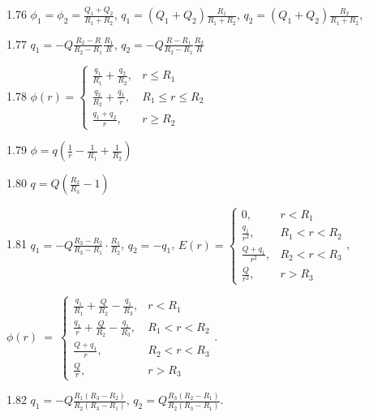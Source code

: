 \begin{Solution}{1.{76}}
	$\phi_1 = \phi_2 = \frac{Q_1 + Q_2}{R_1 + R_2}$, $q_1 = (Q_1 + Q_2) \frac{R_1}{R_1 + R_2}$, $q_2 = (Q_1 + Q_2) \frac{R_2}{R_1 + R_2}$,
\end{Solution}
\begin{Solution}{1.{77}}
	$q_1 = -Q\frac{R_2-R}{R_2-R_1}\frac{R_1}{R}$, $q_2 = -Q\frac{R-R_1}{R_2-R_1}\frac{R_2}{R}$
\end{Solution}
\begin{Solution}{1.{78}}
	$
		\phi(r) =
		\begin{cases}
			\frac{q_1}{R_1} + \frac{q_2}{R_2}, & r \le R_1         \\
			\frac{q_2}{R_2} + \frac{q_1}{r} ,  & R_1 \le r \le R_2 \\
			\frac{q_1 + q_2}{r} ,              & r \ge R_2
		\end{cases}
	$
\end{Solution}
\begin{Solution}{1.{79}}
	$\phi = q\left( \frac{1}{r} - \frac{1}{R_1} + \frac{1}{R_2}\right) $
\end{Solution}
\begin{Solution}{1.{80}}
	$q=Q\left( \frac{R_2}{R_3} - 1\right) $
\end{Solution}
\begin{Solution}{1.{81}}
	$q_1 = - Q\frac{R_3 - R_2}{R_3 - R_1}\cdot \frac{R_1}{R_2}$, $q_2= -q_1$,
	$
		E(r) =
		\begin{cases}
			0,                 & r < R_1       \\
			\frac{q_1}{r^2},   & R_1 < r < R_2 \\
			\frac{Q+q_1}{r^2}, & R_2 < r < R_3 \\
			\frac{Q}{r^2},     & r > R_3
		\end{cases}
	$,

	$
		\phi(r)~=~%
		\begin{cases}
			\frac{q_1}{R_1} + \frac{Q}{R_2} - \frac{q_1}{R_3}, & r < R_1       \\
			\frac{q_1}{r} + \frac{Q}{R_2} - \frac{q_1}{R_3},   & R_1 < r < R_2 \\
			\frac{Q+q_1}{r},                                   & R_2 < r < R_3 \\
			\frac{Q}{r},                                       & r > R_3
		\end{cases}
	$.
\end{Solution}
\begin{Solution}{1.{82}}
	$q_1 = -Q\frac{R_1(R_3 - R_2)}{R_2(R_3 - R_1)}$, $q_2 = Q\frac{R_3(R_2 - R_1)}{R_2(R_3 - R_1)}$.
\end{Solution}
